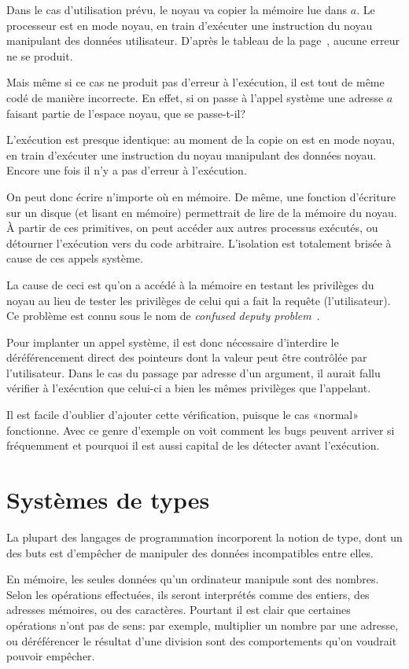 Dans le cas d'utilisation prévu, le noyau va copier la mémoire lue dans $a$. Le
processeur est en mode noyau, en train d'exécuter une instruction du noyau
manipulant des données utilisateur. D'après le tableau de la
page~\pageref{page:erreursec}, aucune erreur ne se produit.

Mais même si ce cas ne produit pas d'erreur à l'exécution, il est tout de même
codé de manière incorrecte. En effet, si on passe à l'appel système une adresse
$a$ faisant partie de l'espace noyau, que se passe-t-il?

L'exécution est presque identique: au moment de la copie on est en mode noyau,
en train d'exécuter une instruction du noyau manipulant des données noyau.
Encore une fois il n'y a pas d'erreur à l'exécution.

On peut donc écrire n'importe où en mémoire. De même, une fonction d'écriture
sur un disque (et lisant en mémoire) permettrait de lire de la mémoire du noyau.
À partir de ces primitives, on peut accéder aux autres processus exécutés, ou
détourner l'exécution vers du code arbitraire. L'isolation est totalement
brisée à cause de ces appels système.

La cause de ceci est qu'on a accédé à la mémoire en testant les privilèges du
noyau au lieu de tester les privilèges de celui qui a fait la requête
(l'utilisateur). Ce problème est connu sous le nom de \emph{confused deputy
problem}~\cite{hardy88confused}.

Pour implanter un appel système, il est donc nécessaire d'interdire le
déréférencement direct des pointeurs dont la valeur peut être contrôlée par
l'utilisateur. Dans le cas du passage par adresse d'un argument, il aurait fallu
vérifier à l'exécution que celui-ci a bien les mêmes privilèges que l'appelant.

Il est facile d'oublier d'ajouter cette vérification, puisque le cas «normal»
fonctionne. Avec ce genre d'exemple on voit comment les bugs peuvent arriver si
fréquemment et pourquoi il est aussi capital de les détecter avant l'exécution.

\section{Systèmes de types}
\label{sec:types-intro}

La plupart des langages de programmation incorporent la notion de type, dont un
des buts est d'empêcher de manipuler des données incompatibles entre elles.

En mémoire, les seules données qu'un ordinateur manipule sont des nombres. Selon
les opérations effectuées, ils seront interprétés comme des entiers, des
adresses mémoires, ou des caractères. Pourtant il est clair que certaines
opérations n'ont pas de sens: par exemple, multiplier un nombre par une adresse,
ou déréférencer le résultat d'une division sont des comportements qu'on voudrait
pouvoir empêcher.

